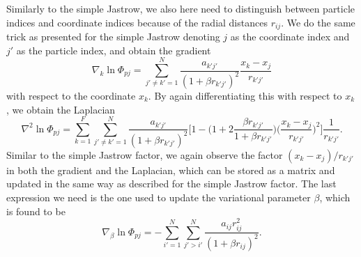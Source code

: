 Similarly to the simple Jastrow, we also here need to distinguish between particle indices and coordinate indices because of the radial distances $r_{ij}$. We do the same trick as presented for the simple Jastrow denoting $j$ as the coordinate index and $j'$ as the particle index, and obtain the gradient 
\begin{equation}
\nabla_k\ln\Phi_{pj}=\sum_{j'\neq k'=1}^N\frac{a_{k'j'}}{(1+\beta r_{k'j'})^2}\frac{x_k-x_j}{r_{k'j'}}
\end{equation}
with respect to the coordinate $x_k$. By again differentiating this with respect to $x_k$, we obtain the Laplacian
\begin{equation}
\nabla^2\ln\Phi_{pj}=\sum_{k=1}^{F}\sum_{j'\neq k'=1}^N\frac{a_{k'j'}}{(1+\beta r_{k'j'})^2}\bigg[1-\Big(1+2\frac{\beta r_{k'j'}}{1+\beta r_{k'j'}}\Big)\Big(\frac{x_k-x_j}{r_{k'j'}}\Big)^2\bigg]\frac{1}{r_{k'j'}}.
\end{equation}
Similar to the simple Jastrow factor, we again observe the factor $(x_k-x_j)/r_{k'j'}$ in both the gradient and the Laplacian, which can be stored as a matrix and updated in the same way as described for the simple Jastrow factor. The last expression we need  is the one used to update the variational parameter $\beta$, which is found to be
\begin{equation}
\nabla_{\beta}\ln\Phi_{pj}=-\sum_{i'=1}^N\sum_{j'>i'}^N\frac{a_{ij}r_{ij}^2}{(1+\beta r_{ij})^2}.
\end{equation}

